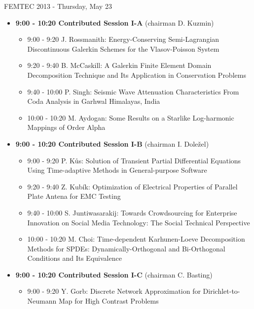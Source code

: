 \documentclass[10pt]{article}%
\begin{document}
\newpage
\newpage

\centerline{\huge FEMTEC 2013 - Thursday, May 23}
\vspace{4mm}

\begin{itemize}    
\item {\bf 9:00 - 10:20 Contributed Session I-A} (chairman D. Kuzmin) 
  \begin{itemize}
    \item 9:00 - 9:20 {J. Rossmanith}: {Energy-Conserving Semi-Lagrangian Discontinuous Galerkin Schemes for the Vlasov-Poisson System} %
    \item 9:20 - 9:40 {B. McCaskill}: {A Galerkin Finite Element Domain Decomposition Technique and Its Application in Conservation Problems}
    \item 9:40 - 10:00 {P. Singh}: {Seismic Wave Attenuation Characteristics  From Coda Analysis in Garhwal Himalayas, India} %
    \item 10:00 - 10:20 {M. Aydogan}: {Some  Results on a Starlike  Log-harmonic Mappings of Order Alpha} %
  \end{itemize}
  \item {\bf 9:00 - 10:20 Contributed Session I-B} (chairman I. Doležel) 
  \begin{itemize}
    \item 9:00 - 9:20 {P. Kůs}: {Solution of Transient Partial Differential Equations Using Time-adaptive Methods in General-purpose Software}
    \item 9:20 - 9:40 {Z. Kubík}: {Optimization of Electrical Properties of Parallel Plate Antena for EMC Testing}
    \item 9:40 - 10:00 {S. Juntiwasarakij}: {Towards Crowdsourcing for Enterprise Innovation on Social Media Technology: The Social Technical Perspective} %
    \item 10:00 - 10:20 {M. Choi}: {Time-dependent Karhunen-Loeve Decomposition Methods for SPDEs: Dynamically-Orthogonal and Bi-Orthogonal Conditions and Its Equivalence}
  \end{itemize}
    \item {\bf 9:00 - 10:20 Contributed Session I-C} (chairman C. Basting) 
  \begin{itemize}
    \item 9:00 - 9:20 {Y. Gorb}: {Discrete Network Approximation for Dirichlet-to-Neumann Map for High Contrast Problems} %

\end{itemize}
\end{itemize}
\end{document}
